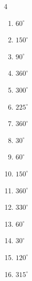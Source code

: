 \begin{multicols}{4}
\begin{enumerate}
  \item $\displaystyle 60^{\circ}$

  \item $\displaystyle 150^{\circ}$

  \item $\displaystyle 90^{\circ}$

  \item $\displaystyle 360^{\circ}$
        \phantom{$\displaystyle =2\pi$}

\columnbreak %

  \item $\displaystyle 300^{\circ}$

  \item $\displaystyle 225^{\circ}$

  \item $\displaystyle 360^{\circ}$
        \phantom{$\displaystyle =2\pi$}

  \item $\displaystyle 30^{\circ}$

  \item $\displaystyle 60^{\circ}$

  \item $\displaystyle 150^{\circ}$

  \item $\displaystyle 360^{\circ}$
        \phantom{$\displaystyle =2\pi$}

  \item $\displaystyle 330^{\circ}$

  \item $\displaystyle 60^{\circ}$

  \item $\displaystyle 30^{\circ}$

  \item $\displaystyle 120^{\circ}$

  \item $\displaystyle 315^{\circ}$


\end{enumerate}
\end{multicols}
